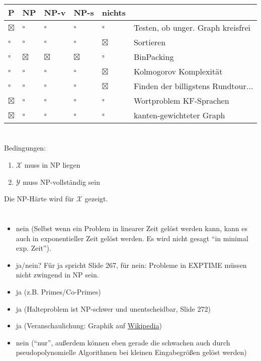 \documentclass{article}
\begin{document}
\section{}
\begin{center}
\begin{tabularx}{\textwidth}{lllll|X}
P & NP & NP-v & NP-s & nichts & \\
\hline
$\boxtimes$ & $\square$ & $\square$ & $\square$ & $\square$ & Testen, ob unger. Graph kreisfrei \\
$\square$ & $\square$ & $\square$ & $\square$ & $\boxtimes$ & Sortieren\\
$\square$ & $\boxtimes$ & $\boxtimes$ & $\boxtimes$ & $\square$ & BinPacking\\
$\square$ & $\square$ & $\square$ & $\square$ & $\boxtimes$ & Kolmogorov Komplexität\\
$\square$ & $\square$ & $\square$ & $\square$ & $\boxtimes$ & Finden der billigstens Rundtour...\\
$\boxtimes$ & $\square$ & $\square$ & $\square$ & $\square$ & Wortproblem KF-Sprachen \\
$\boxtimes$ & $\square$ & $\square$ & $\square$ & $\square$ & kanten-gewichteter Graph \\
\end{tabularx}
\end{center}

\section{}
\subsection{}
Bedingungen:
\begin{enumerate}
  \item $\mathcal{X}$ muss in NP liegen
	\item $\mathcal{Y}$ muss NP-vollständig sein
\end{enumerate}
Die NP-Härte wird für $\mathcal{X}$ gezeigt.

\section{}
\begin{itemize}
	\item nein (Selbst wenn ein Problem in linearer Zeit gelöst werden kann, kann es auch in exponentieller Zeit gelöst werden. Es wird nicht gesagt "`in minimal exp. Zeit"').
  \item ja/nein? Für ja spricht Slide 267, für nein: Probleme in EXPTIME müssen nicht zwingend in NP sein.
  \item ja (z.B. Primes/Co-Primes)
  \item ja (Halteproblem ist NP-schwer und unentscheidbar, Slide 272)
  \item ja (Veranschaulichung: Graphik auf \href{http://en.wikipedia.org/wiki/NP-complete}{Wikipedia})
  \item nein ("`nur"', außerdem können eben gerade die schwachen auch durch pseudopolynomielle Algorithmen bei kleinen Eingabegrößen gelöst werden)
\end{itemize}
\end{document}

